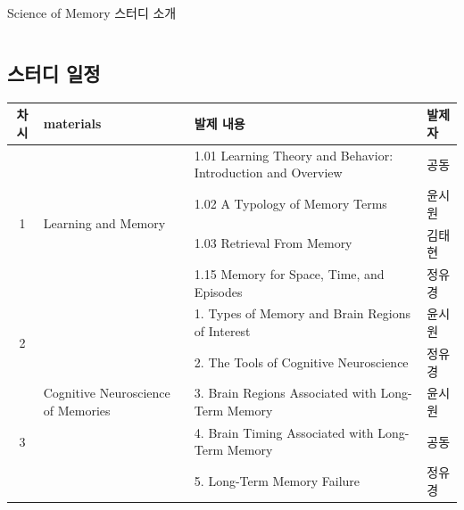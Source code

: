 \documentclass{beamer}
\begin{document}
\begin{frame}{Science of Memory 스터디 소개}
\begin{columns}
\begin{column}{0.6\textwidth}
      \subsection{스터디 일정}
      \begin{table}[]
        \centering
        \scriptsize
        \begin{tabularx}{\textwidth}{|c|p{1cm}|X|l|}
      \hline
      \textbf{차시}        & \textbf{materials}                                            & \textbf{발제 내용}                                                        & \textbf{발제자} \\ \hline
      \multirow{4}{*}{1} & \multirow{4}{*}{\parbox[c]{1cm}{Learning and Memory}}                 & 1.01 Learning Theory and Behavior: Introduction and Overview & 공동           \\ \cline{3-4} 
                         &                                                      & 1.02 A Typology of Memory Terms                              & 윤시원          \\ \cline{3-4} 
                         &                                                      & 1.03 Retrieval From Memory                                   & 김태현          \\ \cline{3-4} 
                         &                                                      & 1.15 Memory for Space, Time, and Episodes                    & 정유경          \\ \hline
      \multirow{2}{*}{2} & \multirow{11}{*}{\parbox[c]{1.1cm}{Cognitive Neuroscience of Memories}} & 1. Types of Memory and Brain Regions of Interest             & 윤시원          \\ \cline{3-4} 
                         &                                                      & 2. The Tools of Cognitive Neuroscience                       & 정유경          \\ \cline{1-1} \cline{3-4} 
      \multirow{3}{*}{3} &                                                      & 3. Brain Regions Associated with Long-Term Memory            & 윤시원          \\ \cline{3-4} 
                         &                                                      & 4. Brain Timing Associated with Long-Term Memory             & 공동           \\ \cline{3-4} 
                         &                                                      & 5. Long-Term Memory Failure                                  & 정유경          \\ \cline{1-1} \cline{3-4} 

\end{tabularx}
\end{table}
\end{column}
\end{columns}
\end{frame}
\end{document}
